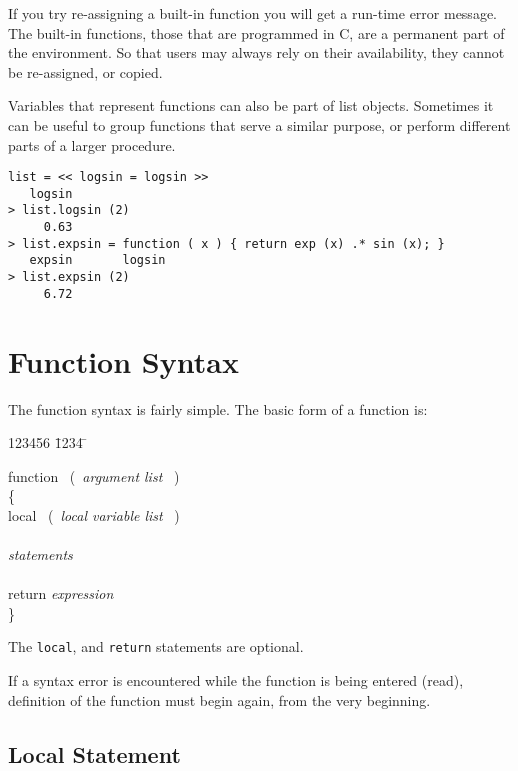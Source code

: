    If you try re-assigning a built-in function you will get a run-time
   error message. The built-in functions, those that are programmed in
   C, are a permanent part of the environment. So that users may
   always rely on their availability, they cannot be re-assigned, or
   copied. 

   Variables that represent functions can also be part of list
   objects. Sometimes it can be useful to group functions that serve a
   similar purpose, or perform different parts of a larger procedure.

\begin{verbatim}
list = << logsin = logsin >>
   logsin       
> list.logsin (2)
     0.63
> list.expsin = function ( x ) { return exp (x) .* sin (x); }
   expsin       logsin       
> list.expsin (2)
     6.72
\end{verbatim}

\section{Function Syntax}

   The function syntax is fairly simple. The basic form of a function
   is:

   \begin{tabbing}
    123456 \= 1234 \=  \kill

    \> function \ (\  {\it argument list} \ ) \\
    \> \{               \\
    \> \> local \ (\ {\it local variable list} \ ) \\
    \> \>               \\
    \> \> {\it statements}    \\
    \> \>               \\
    \> \> return {\it expression } \\
    \> \}               \\
   \end{tabbing}

   The \verb+local+, and \verb+return+ statements are optional.

   If a syntax error is encountered while the function is being
   entered (read), definition of the function must begin again, from
   the very beginning.

\subsection{Local Statement}

